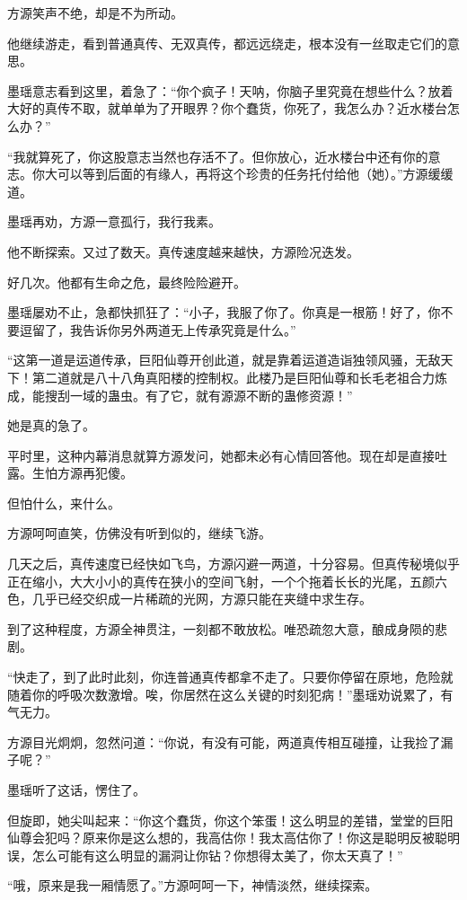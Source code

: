 \begin{this_body}
方源笑声不绝，却是不为所动。

他继续游走，看到普通真传、无双真传，都远远绕走，根本没有一丝取走它们的意思。

墨瑶意志看到这里，着急了：“你个疯子！天呐，你脑子里究竟在想些什么？放着大好的真传不取，就单单为了开眼界？你个蠢货，你死了，我怎么办？近水楼台怎么办？”

“我就算死了，你这股意志当然也存活不了。但你放心，近水楼台中还有你的意志。你大可以等到后面的有缘人，再将这个珍贵的任务托付给他（她）。”方源缓缓道。

墨瑶再劝，方源一意孤行，我行我素。

他不断探索。又过了数天。真传速度越来越快，方源险况迭发。

好几次。他都有生命之危，最终险险避开。

墨瑶屡劝不止，急都快抓狂了：“小子，我服了你了。你真是一根筋！好了，你不要逗留了，我告诉你另外两道无上传承究竟是什么。”

“这第一道是运道传承，巨阳仙尊开创此道，就是靠着运道造诣独领风骚，无敌天下！第二道就是八十八角真阳楼的控制权。此楼乃是巨阳仙尊和长毛老祖合力炼成，能搜刮一域的蛊虫。有了它，就有源源不断的蛊修资源！”

她是真的急了。

平时里，这种内幕消息就算方源发问，她都未必有心情回答他。现在却是直接吐露。生怕方源再犯傻。

但怕什么，来什么。

方源呵呵直笑，仿佛没有听到似的，继续飞游。

几天之后，真传速度已经快如飞鸟，方源闪避一两道，十分容易。但真传秘境似乎正在缩小，大大小小的真传在狭小的空间飞射，一个个拖着长长的光尾，五颜六色，几乎已经交织成一片稀疏的光网，方源只能在夹缝中求生存。

到了这种程度，方源全神贯注，一刻都不敢放松。唯恐疏忽大意，酿成身陨的悲剧。

“快走了，到了此时此刻，你连普通真传都拿不走了。只要你停留在原地，危险就随着你的呼吸次数激增。唉，你居然在这么关键的时刻犯病！”墨瑶劝说累了，有气无力。

方源目光炯炯，忽然问道：“你说，有没有可能，两道真传相互碰撞，让我捡了漏子呢？”

墨瑶听了这话，愣住了。

但旋即，她尖叫起来：“你这个蠢货，你这个笨蛋！这么明显的差错，堂堂的巨阳仙尊会犯吗？原来你是这么想的，我高估你！我太高估你了！你这是聪明反被聪明误，怎么可能有这么明显的漏洞让你钻？你想得太美了，你太天真了！”

“哦，原来是我一厢情愿了。”方源呵呵一下，神情淡然，继续探索。


\end{this_body}
